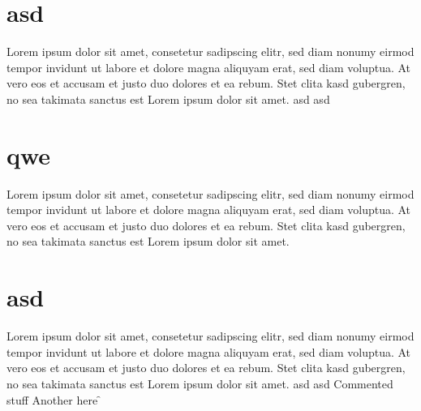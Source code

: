 \documentclass{article}
\begin{document}
\iftrue
\section{asd}
Lorem ipsum dolor sit amet, consetetur sadipscing elitr, sed diam nonumy eirmod
tempor invidunt ut labore et dolore magna aliquyam erat, sed diam voluptua. At
vero eos et accusam et justo duo dolores et ea rebum. Stet clita kasd
gubergren, no sea takimata sanctus est Lorem ipsum dolor sit amet.
\ifasd \fi
\ifaa asd \else asd \fi
\fi

\section{qwe}
Lorem ipsum dolor sit amet, consetetur sadipscing elitr, sed diam nonumy eirmod
tempor invidunt ut labore et dolore magna aliquyam erat, sed diam voluptua. At
vero eos et accusam et justo duo dolores et ea rebum. Stet clita kasd
gubergren, no sea takimata sanctus est Lorem ipsum dolor sit amet.

\iftrue
\section{asd}
Lorem ipsum dolor sit amet, consetetur sadipscing elitr, sed diam nonumy eirmod
tempor invidunt ut labore et dolore magna aliquyam erat, sed diam voluptua. At
vero eos et accusam et justo duo dolores et ea rebum. Stet clita kasd
gubergren, no sea takimata sanctus est Lorem ipsum dolor sit amet.
\ifasd \fi
\ifaa asd \else asd \fi
\else
Commented stuff
Another \ifstuff here \fi
\ifaa \else \fi
\ifasd \fi \f \fii
\fi
\end{document}
